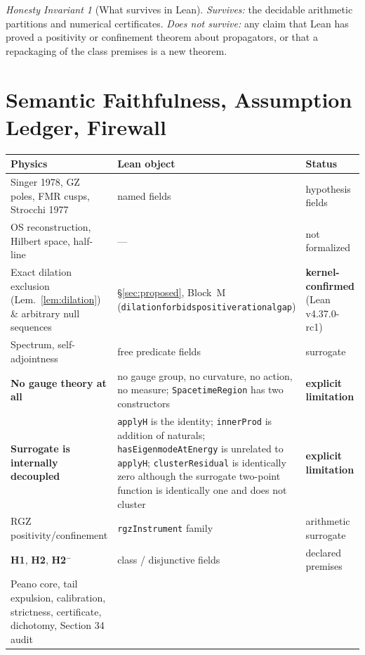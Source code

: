 \documentclass[11pt,a4paper]{article}
\theoremstyle{plain}
\theoremstyle{definition}
\theoremstyle{remark}
\newtheorem{invariant}[theorem]{Honesty Invariant}
\renewcommand{\_}{\oldunderscore\allowbreak}
\newcommand{\Lean}[1]{\texttt{\small #1}}
\begin{document}
\begin{invariant}[What survives in Lean]
\emph{Survives:} the decidable arithmetic partitions and numerical certificates.
\emph{Does not survive:} any claim that Lean has proved a positivity or confinement theorem about
propagators, or that a repackaging of the class premises is a new theorem.
\end{invariant}
\section{Semantic Faithfulness, Assumption Ledger, Firewall}
\begin{table}[htbp]\centering\small
\renewcommand{\arraystretch}{1.18}
\begin{tabularx}{\textwidth}{p{4.2cm} X p{2.9cm}}
\toprule
\textbf{Physics} & \textbf{Lean object} & \textbf{Status}\\
\midrule
Singer 1978, GZ poles, FMR cusps, Strocchi 1977 & named fields & hypothesis fields\\
OS reconstruction, Hilbert space, half-line & --- & not formalized\\
Exact dilation exclusion (Lem.~\ref{lem:dilation}) \& arbitrary null sequences & \S\ref{sec:proposed}, Block~M (\Lean{dilation\_forbids\_positive\_rational\_gap}) & \textbf{kernel-confirmed} (Lean v4.37.0-rc1)\\
Spectrum, self-adjointness & free predicate fields & surrogate\\
\textbf{No gauge theory at all} & no gauge group, no curvature, no action, no measure;
\Lean{SpacetimeRegion} has two constructors & \textbf{explicit limitation}\\
\textbf{Surrogate is internally decoupled} & \Lean{applyH} is the identity;
\Lean{innerProd} is addition of naturals; \Lean{hasEigenmodeAtEnergy} is unrelated to
\Lean{applyH}; \Lean{clusterResidual} is identically zero although the surrogate two-point
function is identically one and does not cluster & \textbf{explicit limitation}\\
RGZ positivity/confinement & \Lean{rgzInstrument} family & arithmetic surrogate\\
\textbf{H1}, \textbf{H2}, \textbf{H2$^-$} & class / disjunctive fields & declared premises\\
Peano core, tail expulsion, calibration, strictness, certificate, dichotomy, Section 34 audit &

\end{tabularx}
\end{table}
\end{document}

